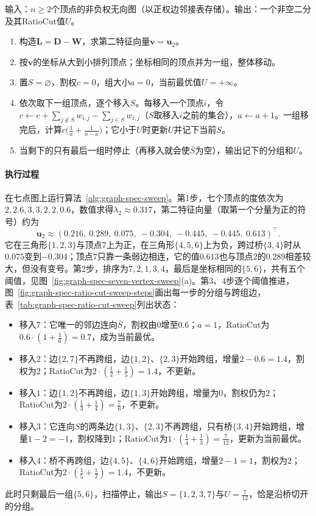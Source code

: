 \begin{algorithm}
\label{alg:graph-spec-sweep}
输入：$n\geq2$个顶点的非负权无向图（以正权边邻接表存储）。输出：一个非空二分及其RatioCut值$U$。
\begin{enumerate}
 \item 构造$\bm L=\bm D-\bm W$，求第二特征向量$\bm v=\bm u_2$。
 \item 按$\bm v$的坐标从大到小排列顶点；坐标相同的顶点并为一组，整体移动。
 \item 置$S=\varnothing$，割权$c=0$，组大小$a=0$，当前最优值$U=+\infty$。
 \item 依次取下一组顶点，逐个移入$S$。每移入一个顶点$i$，令$c\gets c+\sum_{j\notin S}w_{i,j}-\sum_{j\in S}w_{i,j}$（$S$取移入$i$之前的集合），$a\gets a+1$。一组移完后，计算$c\bigl(\tfrac1a+\tfrac1{n-a}\bigr)$；它小于$U$时更新$U$并记下当前$S$。
 \item 当剩下的只有最后一组时停止（再移入就会使$\bar S$为空），输出记下的分组和$U$。
\end{enumerate}
\end{algorithm}

\paragraph{执行过程}
在七点图上运行算法~\ref{alg:graph-spec-sweep}。第1步，七个顶点的度依次为$2,2.6,3,3,2,2,0.6$，数值求得$\lambda_2\approx0.317$，第二特征向量（取第一个分量为正的符号）约为
\[
 \bm u_2\approx(0.216,\ 0.289,\ 0.075,\ -0.304,\ -0.445,\ -0.445,\ 0.613)^{\top}.
\]
它在三角形$\{1,2,3\}$与顶点$7$上为正，在三角形$\{4,5,6\}$上为负，跨过桥$\{3,4\}$时从$0.075$变到$-0.304$；顶点$7$只靠一条弱边相连，它的值$0.613$也与顶点$2$的$0.289$相差较大，但没有变号。第2步，排序为$7,2,1,3,4$，最后是坐标相同的$\{5,6\}$，共有五个阈值，见图~\ref{fig:graph-spec-seven-vertex-sweep}(a)。第3、4步逐个阈值推进，图~\ref{fig:graph-spec-ratio-cut-sweep-steps}画出每一步的分组与跨组边，表~\ref{tab:graph-spec-ratio-cut-sweep}列出状态：
\begin{itemize}
  \item 移入$7$：它唯一的邻边连向$\bar S$，割权由$0$增至$0.6$；$a=1$，RatioCut为$0.6\cdot(1+\tfrac16)=0.7$，成为当前最优。
  \item 移入$2$：边$\{2,7\}$不再跨组，边$\{1,2\}$、$\{2,3\}$开始跨组，增量$2-0.6=1.4$，割权为$2$；RatioCut为$2\cdot(\tfrac12+\tfrac15)=1.4$，不更新。
  \item 移入$1$：边$\{1,2\}$不再跨组，边$\{1,3\}$开始跨组，增量为$0$，割权仍为$2$；RatioCut为$2\cdot(\tfrac13+\tfrac14)=\tfrac76$，不更新。
  \item 移入$3$：它连向$S$的两条边$\{1,3\}$、$\{2,3\}$不再跨组，只有桥$\{3,4\}$开始跨组，增量$1-2=-1$，割权降到$1$；RatioCut为$1\cdot(\tfrac14+\tfrac13)=\tfrac7{12}$，更新为当前最优。
  \item 移入$4$：桥不再跨组，边$\{4,5\}$、$\{4,6\}$开始跨组，增量$2-1=1$，割权为$2$；RatioCut为$2\cdot(\tfrac15+\tfrac12)=1.4$，不更新。
\end{itemize}
此时只剩最后一组$\{5,6\}$，扫描停止，输出$S=\{1,2,3,7\}$与$U=\tfrac7{12}$，恰是沿桥切开的分组。

